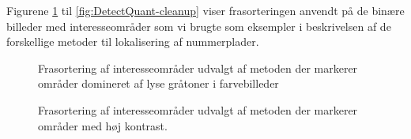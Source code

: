 Figurene \ref{fig:DetectSameness-cleanup} til \ref{fig:DetectQuant-cleanup} viser frasorteringen anvendt på de binære billeder med interesseområder som vi brugte som eksempler i beskrivelsen af de forskellige metoder til lokalisering af nummerplader. 

\begin{figure}[htbp]
  \centering
  \begin{minipage}[b]{5 cm}
  \end{minipage}
  \begin{minipage}[b]{5 cm}
  \end{minipage}
  \caption{Frasortering af interesseområder udvalgt af metoden der markerer områder domineret af lyse gråtoner i farvebilleder}
  \label{fig:DetectSameness-cleanup}
\end{figure}

\begin{figure}[htbp]
  \centering
  \begin{minipage}[b]{5 cm}
  \end{minipage}
  \begin{minipage}[b]{5 cm}
  \end{minipage}
  \caption{Frasortering af interesseområder udvalgt af metoden der markerer områder med høj kontrast.}
   \label{fig:DetectContrastAvg-cleanup}
\end{figure}

